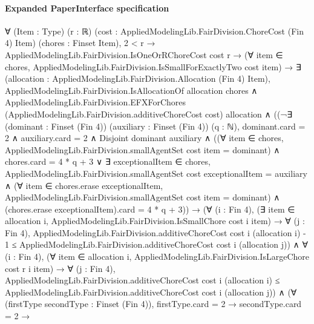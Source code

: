 \documentclass[10pt]{article}
\begin{document}
\paragraph{Expanded PaperInterface specification}
\begin{ReviewVerbatim}
∀ (Item : Type) (r : ℝ) (cost : AppliedModelingLib.FairDivision.ChoreCost (Fin 4) Item) (chores : Finset Item),
  2 < r →
    AppliedModelingLib.FairDivision.IsOneOrRChoreCost cost r →
      (∀ item ∈ chores, AppliedModelingLib.FairDivision.IsSmallForExactlyTwo cost item) →
        ∃ (allocation : AppliedModelingLib.FairDivision.Allocation (Fin 4) Item),
          AppliedModelingLib.FairDivision.IsAllocationOf allocation chores ∧
            AppliedModelingLib.FairDivision.EFXForChores (AppliedModelingLib.FairDivision.additiveChoreCost cost)
                allocation ∧
              ((¬∃ (dominant : Finset (Fin 4)) (auxiliary : Finset (Fin 4)) (q : ℕ),
                      dominant.card = 2 ∧
                        auxiliary.card = 2 ∧
                          Disjoint dominant auxiliary ∧
                            ((∀ item ∈ chores, AppliedModelingLib.FairDivision.smallAgentSet cost item = dominant) ∧
                                chores.card = 4 * q + 3 ∨
                              ∃ exceptionalItem ∈ chores,
                                AppliedModelingLib.FairDivision.smallAgentSet cost exceptionalItem = auxiliary ∧
                                  (∀ item ∈ chores.erase exceptionalItem,
                                      AppliedModelingLib.FairDivision.smallAgentSet cost item = dominant) ∧
                                    (chores.erase exceptionalItem).card = 4 * q + 3)) →
                  (∀ (i : Fin 4),
                      (∃ item ∈ allocation i, AppliedModelingLib.FairDivision.IsSmallChore cost i item) →
                        ∀ (j : Fin 4),
                          AppliedModelingLib.FairDivision.additiveChoreCost cost i (allocation i) - 1 ≤
                            AppliedModelingLib.FairDivision.additiveChoreCost cost i (allocation j)) ∧
                    ∀ (i : Fin 4),
                      (∀ item ∈ allocation i, AppliedModelingLib.FairDivision.IsLargeChore cost r i item) →
                        ∀ (j : Fin 4),
                          AppliedModelingLib.FairDivision.additiveChoreCost cost i (allocation i) ≤
                            AppliedModelingLib.FairDivision.additiveChoreCost cost i (allocation j)) ∧
                (∀ (firstType secondType : Finset (Fin 4)),
                    firstType.card = 2 →
                      secondType.card = 2 →

\end{ReviewVerbatim}
\end{document}
